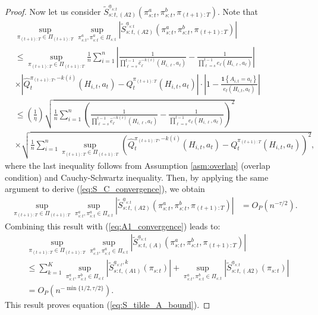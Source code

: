 \begin{proof}
Now let us consider $\widetilde{S}_{s:t,(A2)}^{\underline{a}_{s:t}}(\pi_{s:t}^{a},\pi_{s:t}^{b},\pi_{(t+1):T})$. Note that 
\begin{align*}
    	&\sup_{\pi_{(t+1):T}\in \Pi_{(t+1):T}}\sup_{\pi_{s:t}^{a},\pi_{s:t}^{a}\in \Pi_{s:t}}\left|\widetilde{S}_{s:t,(A2)}^{\underline{a}_{s:t}}(\pi_{s:t}^{a},\pi_{s:t}^{b},\pi_{(t+1):T})\right|\\
    	&\leq\sup_{\pi_{(t+1):T}\in \Pi_{(t+1):T}}\frac{1}{n}\sum_{i=1}^{n}\left|\frac{1}{\prod_{\ell=s}^{t-1}\hat{e}_{\ell}^{-k(i)}(H_{i,\ell},a_{\ell})}-\frac{1}{\prod_{\ell=s}^{t-1}e_{\ell}(H_{i,\ell},a_{\ell})}\right|\\
     &\times\left|\widehat{Q}_{t}^{\pi_{(t+1):T},-k(i)}\left(H_{i,t},a_{t}\right)-Q_{t}^{\pi_{(t+1):T}}\left(H_{i,t},a_{t}\right)\right|
    	\cdot \left|1-\frac{\mathbf{1}\left\{ A_{i,t}=a_{t}\right\} }{e_{t}\left(H_{i,t},a_{t}\right)}\right|\\
	&\leq\left(\frac{1}{\eta}\right)\sqrt{\frac{1}{n}\sum_{i=1}^{n}\left(\frac{1}{\prod_{\ell=s}^{t-1}\hat{e}_{\ell}^{-k(i)}(H_{i,\ell},a_{\ell})}-\frac{1}{\prod_{\ell=s}^{t-1}e_{\ell}(H_{i,\ell},a_{\ell})}\right)^{2}}\\
	&\times \sqrt{\frac{1}{n}\sum_{i=1}^{n}\sup_{\pi_{(t+1):T}\in \Pi_{(t+1):T}}\left(\widehat{Q}_{t}^{\pi_{(t+1):T},-k(i)}\left(H_{i,t},a_{t}\right)-Q_{t}^{\pi_{(t+1):T}}\left(H_{i,t},a_{t}\right)\right)^{2}},
\end{align*}
where the last inequality follows from Assumption \ref{asm:overlap} (overlap condition) and Cauchy-Schwartz inequality. Then, by applying the same argument to derive (\ref{eq:S_C_convergence}), we obtain
\begin{align*}
    \sup_{\pi_{(t+1):T} \in \Pi_{(t+1):T}}\sup_{\pi_{s:t}^{a},\pi_{s:t}^{a}\in \Pi_{s:t}} \left| \widetilde{S}_{s:t,(A2)}^{\underline{a}_{s:t}}(\pi_{s:t}^{a},\pi_{s:t}^{b},\pi_{(t+1):T})\right| &= O_{P}\left(n^{-\tau/2}\right).
\end{align*}
 Combining this result with (\ref{eq:A1_convergence}) leads to: 
 \begin{align*}
     &\sup_{\pi_{(t+1):T} \in \Pi_{(t+1):T}}\sup_{\pi_{s:t}^{a},\pi_{s:t}^{a}\in \Pi_{s:t}} \left| \widetilde{S}_{s:t,(A)}^{\underline{a}_{s:t}}(\pi_{s:t}^{a},\pi_{s:t}^{b},\pi_{(t+1):T})\right| \\
     &\leq \sum_{k=1}^{K} \sup_{\pi_{s:t}^a , \pi_{s:t}^b \in \Pi_{s:t}} \left| \widetilde{S}_{s:t,(A1)}^{\underline{a}_{s:t},k}\left(\pi_{s:t}\right)\right| 
     + \sup_{\pi_{s:t}^a , \pi_{s:t}^b \in \Pi_{s:t}} \left| \widetilde{S}_{s:t,(A2)}^{\underline{a}_{s:t}}\left(\pi_{s:t}\right)\right| \\
     &= O_{P}\left(n^{-\min\{1/2,\tau/2\}}\right).
 \end{align*}
 This result proves equation (\ref{eq:S_tilde_A_bound}). 


\end{proof}
